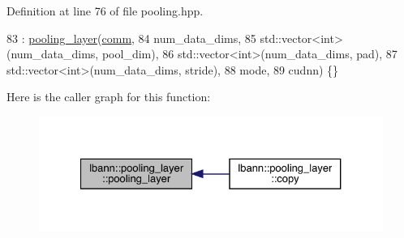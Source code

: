 Definition at line 76 of file pooling.\+hpp.


\begin{DoxyCode}
83     : \hyperlink{classlbann_1_1pooling__layer_a012223832bcd60644724425488059152}{pooling\_layer}(\hyperlink{file__io_8cpp_ab048c6f9fcbcfaa57ce68b00263dbebe}{comm},
84                     num\_data\_dims,
85                     std::vector<int>(num\_data\_dims, pool\_dim),
86                     std::vector<int>(num\_data\_dims, pad),
87                     std::vector<int>(num\_data\_dims, stride),
88                     mode,
89                     cudnn) \{\}
\end{DoxyCode}
Here is the caller graph for this function\+:\nopagebreak
\begin{figure}[H]
\begin{center}
\leavevmode
\includegraphics[width=327pt]{classlbann_1_1pooling__layer_a012223832bcd60644724425488059152_icgraph}
\end{center}
\end{figure}
\mbox{\label{classlbann_1_1pooling__layer_ad0694acb2188cb539a1ae616846600c3}} 
